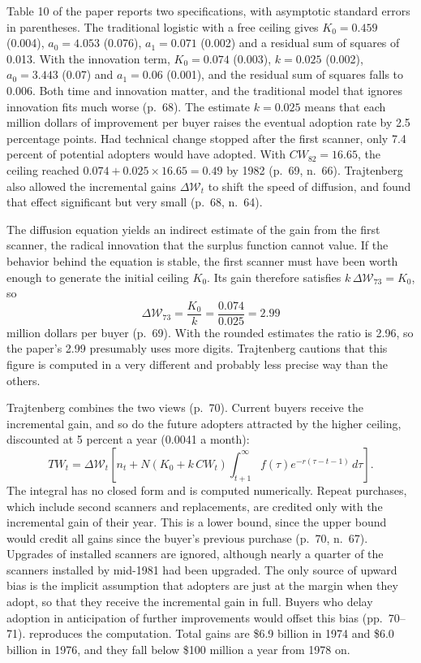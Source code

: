 Table 10 of the paper reports two specifications, with asymptotic standard errors in parentheses. The traditional
logistic with a free ceiling gives $K_0 = 0.459$ (0.004), $a_0 = 4.053$ (0.076), $a_1 = 0.071$ (0.002) and a residual
sum of squares of 0.013. With the innovation term, $K_0 = 0.074$ (0.003), $k = 0.025$ (0.002), $a_0 = 3.443$ (0.07)
and $a_1 = 0.06$ (0.001), and the residual sum of squares falls to 0.006. Both time and innovation matter, and the
traditional model that ignores innovation fits much worse (p.~68). The estimate $k = 0.025$ means that each million
dollars of improvement per buyer raises the eventual adoption rate by 2.5 percentage points. Had technical change
stopped after the first scanner, only 7.4 percent of potential adopters would have adopted. With $CW_{82} = 16.65$,
the ceiling reached $0.074 + 0.025\times16.65 = 0.49$ by 1982 (p.~69, n.~66). Trajtenberg also allowed the incremental
gains $\Delta\mathcal{W}_t$ to shift the speed of diffusion, and found that effect significant but very small (p.~68,
n.~64).

 The diffusion equation yields an indirect estimate of the gain from the
first scanner, the radical innovation that the surplus function cannot value. If the behavior behind the equation is
stable, the first scanner must have been worth enough to generate the initial ceiling $K_0$. Its gain therefore
satisfies $k\,\Delta\mathcal{W}_{73} = K_0$, so
\begin{equation*}
\Delta\mathcal{W}_{73} = \frac{K_0}{k} = \frac{0.074}{0.025} = 2.99
\end{equation*}
million dollars per buyer (p.~69). With the rounded estimates the ratio is 2.96, so the paper's 2.99 presumably uses
more digits. Trajtenberg cautions that this figure is computed in a very different and probably less precise way than
the others.

 Trajtenberg combines the two views (p.~70). Current buyers receive the incremental gain, and so do
the future adopters attracted by the higher ceiling, discounted at 5 percent a year (0.0041 a month):
\begin{equation}\label{eq:10-traj-TW}
TW_t = \Delta\mathcal{W}_t\left[n_t + N\left(K_0 + k\,CW_t\right)\int_{t+1}^{\infty}f(\tau)e^{-r(\tau - t - 1)}\,d\tau\right].
\end{equation}
The integral has no closed form and is computed numerically. Repeat purchases, which include second scanners and
replacements, are credited only with the incremental gain of their year. This is a lower bound, since the upper bound
would credit all gains since the buyer's previous purchase (p.~70, n.~67). Upgrades of installed scanners are ignored,
although nearly a quarter of the scanners installed by mid-1981 had been upgraded. The only source of upward bias is
the implicit assumption that adopters are just at the margin when they adopt, so that they receive the incremental gain
in full. Buyers who delay adoption in anticipation of further improvements would offset this bias (pp.~70--71).
 reproduces the computation. Total gains are \$6.9 billion in 1974 and \$6.0 billion in 1976, and
they fall below \$100 million a year from 1978 on.

